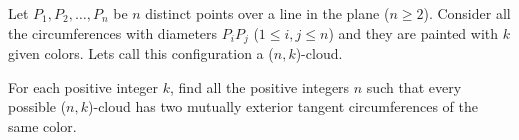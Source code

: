 Let $P_1,P_2,\dots,P_n$ be $n$ distinct points over a line in the plane ($n\geq2$). Consider all the circumferences with diameters $P_iP_j$ ($1\leq{i,j}\leq{n}$) and they are painted with $k$ given colors. Lets call this configuration a ($n,k$)-cloud.

For each positive integer $k$,  find all the positive integers $n$ such that every possible ($n,k$)-cloud has two mutually exterior tangent circumferences of the same color.